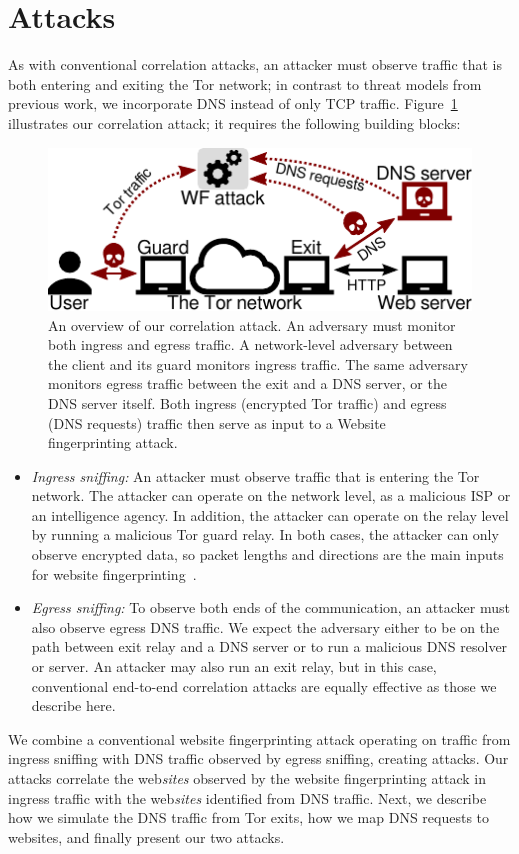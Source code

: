 \section{\name Attacks}
\label{sec:attack}

As with conventional correlation attacks, an attacker must observe
traffic that is both entering and exiting
the Tor network; in contrast to threat models from previous work, we
incorporate DNS instead of only
TCP traffic.
Figure~\ref{fig:attack-scenario} illustrates our correlation attack; it requires the
following building blocks:
\begin{figure}[t]
	\centering
	\includegraphics[width=0.8\linewidth]{figures/attack-scenario.pdf}
	\caption{An overview of our correlation attack.  An adversary must monitor
		both ingress and egress traffic.  A network-level adversary between the
		client and its guard monitors ingress traffic.  The same adversary
		monitors egress traffic between the exit and a DNS server, or the DNS
		server itself.  Both ingress (encrypted Tor traffic) and egress (DNS
		requests) traffic then serve as input to a Website fingerprinting
		attack.}
	\label{fig:attack-scenario}
\end{figure}

\begin{itemize}
    \item \emph{Ingress sniffing:} An attacker must observe traffic that is
		entering the Tor network.  The attacker can operate on the network level,
		as a malicious ISP or an intelligence agency.  In addition, the
		attacker can operate on the relay level by running a malicious Tor guard
		relay.  In both cases, the attacker can only observe encrypted
		data, so packet lengths and
		directions are the main inputs for website fingerprinting~\cite{Panchenko2016a}.
    \item \emph{Egress sniffing:} To observe both ends of the communication, an
		attacker must also observe egress DNS traffic.  We expect the adversary
		either to be on the path between exit relay
		and a DNS server or to run a malicious DNS
		resolver or server.  An attacker may also run an exit relay,
		but in this case, conventional end-to-end correlation
                attacks are equally effective as those we describe here.
\end{itemize}
We combine a conventional website fingerprinting attack operating on traffic
from ingress sniffing with
DNS traffic observed by egress sniffing, creating \name attacks. Our attacks
correlate the web\emph{sites} observed by the website fingerprinting attack in
ingress traffic with
the web\emph{sites} identified from DNS traffic. Next, we describe how we
simulate the DNS traffic from Tor exits, how we map DNS requests to websites,
and finally present our two \name attacks.


